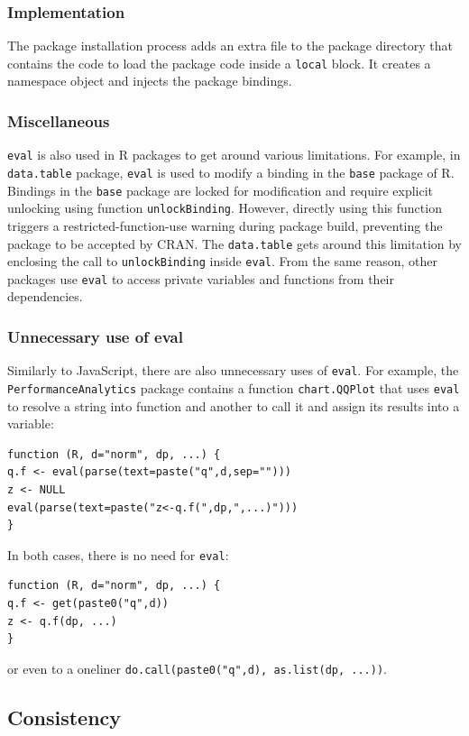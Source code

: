 \documentclass[USenglish,cleveref, autoref, thm-restate]{lipics-v2019}
\newcommand{\eval}{\texttt{eval}\xspace}
\newcommand{\local}{\c{local}}
\newcommand{\unlockBinding}{\c{unlockBinding}}
\newcommand{\datatable}{\c{data.table}}
\newcommand{\base}{\c{base}}
\renewcommand{\c}[1]{\lstinline{#1}\xspace}
\begin{document}
  \subsubsection{Implementation}
  The package installation process adds an extra file to the package directory
  that contains the code to load the package code inside a \local block. It
  creates a namespace object and injects the package bindings.

  \subsubsection{Miscellaneous} \eval is also used in R packages to get around
  various limitations. For example, in \datatable package, \eval is used to
  modify a binding in the \base package of R. Bindings in the \base package are
  locked for modification and require explicit unlocking using 
  function \unlockBinding. However, directly using this function triggers a
  restricted-function-use warning during package build, preventing the package
  to be accepted by CRAN. The \datatable gets around this limitation by
  enclosing the call to \unlockBinding inside \eval. From the same reason, other
  packages use \eval to access private variables and functions from their
  dependencies.

  \subsubsection{Unnecessary use of eval}
  Similarly to JavaScript, there are also unnecessary uses of \eval.
  For example, the \c{PerformanceAnalytics} package contains a function
  \c{chart.QQPlot} that uses \eval to resolve a string into function and
  another to call it and assign its results into a variable:
  \begin{lstlisting}
function (R, d="norm", dp, ...) {
q.f <- eval(parse(text=paste("q",d,sep="")))
z <- NULL
eval(parse(text=paste("z<-q.f(",dp,",...)")))
}
  \end{lstlisting}
  In both cases, there is no need for \eval:
  \begin{lstlisting}
function (R, d="norm", dp, ...) {
q.f <- get(paste0("q",d))
z <- q.f(dp, ...)
}
  \end{lstlisting}
  or even to a oneliner \c{do.call(paste0("q",d), as.list(dp, ...))}.

\subsection{Consistency}
\end{document}
